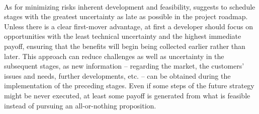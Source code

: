 \documentclass[twoside]{report}
\begin{document}
	\paragraph{}
	As for minimizing risks inherent development and feasibility, \cite{tiwana_platform_2014} suggests to schedule stages with the greatest uncertainty as late as possible in the project roadmap. Unless there is a clear first-mover advantage, at first a developer should focus on opportunities with the least technical uncertainty and the highest immediate payoff, ensuring that the benefits will begin being collected earlier rather than later. This approach can reduce challenges as well as uncertainty in the subsequent stages, as new information – regarding the market, the customers' issues and needs, further developments, etc. – can be obtained during the implementation of the preceding stages. Even if some steps of the future strategy might be never executed, at least some payoff is generated from what is feasible instead of pursuing an all-or-nothing proposition.
\end{document}
